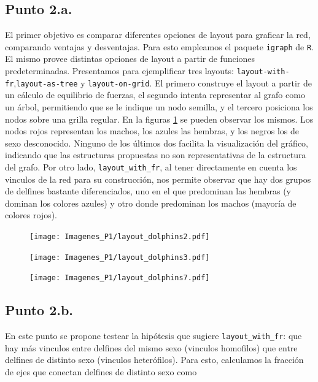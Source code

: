 \documentclass{article}
\begin{document}
\subsection{Punto 2.a.}
El primer objetivo es comparar diferentes opciones de layout para graficar la red, comparando ventajas y desventajas. Para esto empleamos el paquete \texttt{igraph} de \texttt{R}. El mismo provee distintas opciones de layout a partir de funciones predeterminadas. Presentamos para ejemplificar tres layouts: \texttt{layout-with-fr},\texttt{layout-as-tree} y \texttt{layout-on-grid}. El primero construye el layout a partir de un cálculo de equilibrio de fuerzas, el segundo intenta representar al grafo como un árbol, permitiendo que se le indique un nodo semilla, y el tercero posiciona los nodos sobre una grilla regular. En la figuras \ref{pt2layouts} se pueden observar los mismos. Los nodos rojos representan los machos, los azules las hembras, y los negros los de sexo desconocido. Ninguno de los últimos dos facilita la visualización del gráfico, indicando que las estructuras propuestas no son representativas de la estructura del grafo. Por otro lado, \texttt{layout\_with\_fr}, al tener directamente en cuenta los vinculos de la red para su construcción, nos permite observar que hay dos grupos de delfines bastante diferenciados, uno en el que predominan las hembras (y dominan los colores azules) y otro donde predominan los machos (mayoría de colores rojos).

\begin{figure}[!htb]
   \begin{minipage}{0.3\textwidth}
	\centering
	\texttt{[image: Imagenes\_P1/layout\_dolphins2.pdf]}
	\label{pt2layoutsfr}
   \end{minipage}\hfill
   \begin{minipage}{0.3\textwidth}
	\centering
	\texttt{[image: Imagenes\_P1/layout\_dolphins3.pdf]}
	\label{pt2layouttree}
   \end{minipage}\hfill
   \begin{minipage}{0.3\textwidth}
	\centering
	\texttt{[image: Imagenes\_P1/layout\_dolphins7.pdf]}
	\label{pt2layoutgrid}
   \end{minipage}
   \label{pt2layouts}
\end{figure}


\subsection{Punto 2.b.}
En este punto se propone testear la hipótesis que sugiere \texttt{layout\_with\_fr}: que hay más vinculos entre delfines del mismo sexo (vinculos homofilos) que entre delfines de distinto sexo (vinculos heter\'ofilos). Para esto, calculamos la fracción de ejes que conectan delfines de distinto sexo como
\end{document}
